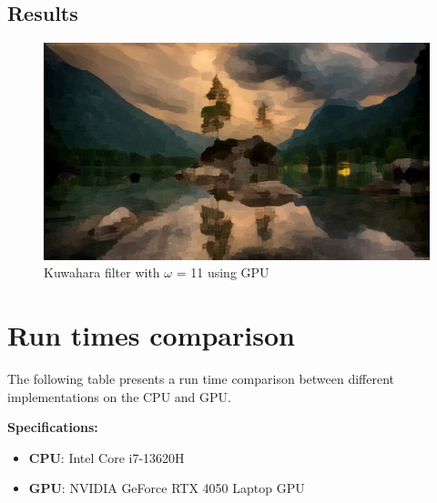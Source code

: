 \documentclass{article}
\begin{document}
\subsection{Results}
\begin{figure}[H]
    \centering
    \includegraphics[width=1\linewidth]{Kuwa_GPUSM_(w=11).jpg}
    \caption{Kuwahara filter with $\omega$ = 11 using GPU}
    \label{fig:enter-label}
\end{figure}
\section{Run times comparison}

The following table presents a run time comparison between different implementations on the CPU and GPU.

\textbf{Specifications:}
\begin{itemize}
    \item \textbf{CPU}: Intel Core i7-13620H
    \item \textbf{GPU}: NVIDIA GeForce RTX 4050 Laptop GPU
\end{itemize}


\begin{table}[H]
\centering
{}
\caption{Runtime comparison between 3 different methods on five different window sizes}
\label{tab:my-table}
\end{table}
\end{document}
